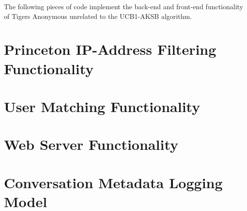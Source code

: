 The following pieces of code implement the back-end and front-end functionality of Tigers Anonymous unrelated to the UCB1-AKSB algorithm.

\section{Princeton IP-Address Filtering Functionality}


\section{User Matching Functionality}


\section{Web Server Functionality}


\section{Conversation Metadata Logging Model}

